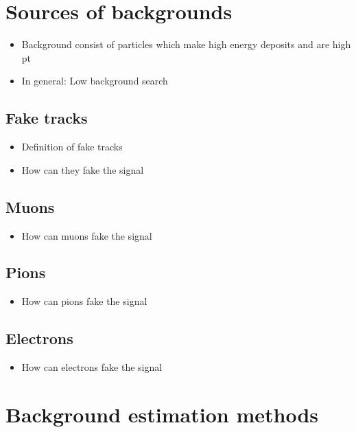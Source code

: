 \section{Sources of backgrounds}
\label{sec:SourcesOfBackgrounds}
\begin{itemize}
\item Background consist of particles which make high energy deposits and are high pt
\item In general: Low background search
\end{itemize}
\subsection{Fake tracks}
\begin{itemize}
\item Definition of fake tracks
\item How can they fake the signal
\end{itemize}
\subsection{Muons}
\begin{itemize}
\item How can muons fake the signal
\end{itemize}
\subsection{Pions}
\begin{itemize}
\item How can pions fake the signal
\end{itemize}
\subsection{Electrons}
\begin{itemize}
\item How can electrons fake the signal
\end{itemize}
\section{Background estimation methods}
\label{sec:BackgroundEstimation}
